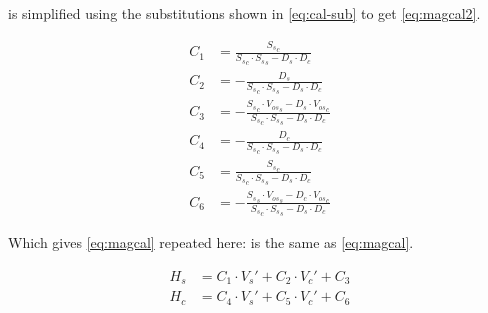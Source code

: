  is simplified using the substitutions shown in \cref{eq:cal-sub} to get \cref{eq:magcal2}.

\begin{equation}
    \begin{aligned}
        C_1 &=   \frac{{S_s}_c}{{S_s}_c \cdot {S_s}_s - D_s \cdot D_c}\\
        C_2 &= - \frac{D_s}{{S_s}_c \cdot {S_s}_s - D_s \cdot D_c}\\
        C_3 &= - \frac{{S_s}_c \cdot {V_{os}}_s  -D_s \cdot {V_{os}}_c}{{S_s}_c \cdot {S_s}_s - D_s \cdot D_c}\\
        C_4 &= - \frac{D_c}{{S_s}_c \cdot {S_s}_s - D_s \cdot D_c}\\
        C_5 &= \frac{{S_s}_c}{{S_s}_c \cdot {S_s}_s - D_s \cdot D_c}\\
        C_6 &= - \frac{{S_s}_s \cdot {V_{os}}_s  -D_c \cdot {V_{os}}_c}{{S_s}_c \cdot {S_s}_s - D_s \cdot D_c}
    \end{aligned}
    \label{eq:cal-sub}
\end{equation}

Which gives \cref{eq:magcal} repeated here:
 is the same as \cref{eq:magcal}.

\begin{equation}
    \begin{split}
        H_s &= C_1 \cdot V_s' + C_2 \cdot V_c' + C_3\\
        H_c &= C_4 \cdot V_s' + C_5 \cdot V_c' + C_6
    \end{split}
    \label{eq:magcal2}
\end{equation}



